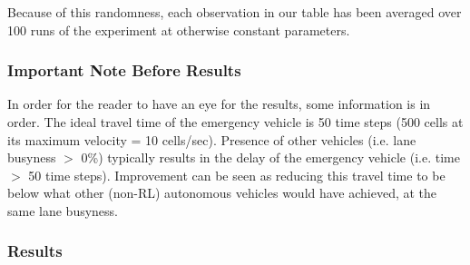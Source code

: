 Because of this randomness, each observation in our table has been averaged over 100 runs of the experiment at otherwise constant parameters.

\subsubsection{Important Note Before Results}
In order for the reader to have an eye for the results, some information is in order. The ideal travel time of the emergency vehicle is 50 time steps (500 cells at its maximum velocity = 10 cells/sec). Presence of other vehicles (i.e. lane busyness $>$ 0\%) typically results in the delay of the emergency vehicle (i.e. time $>$ 50 time steps). Improvement can be seen as reducing this travel time to be below what other (non-RL) autonomous vehicles would have achieved, at the same lane busyness. 

\subsubsection{Results}


